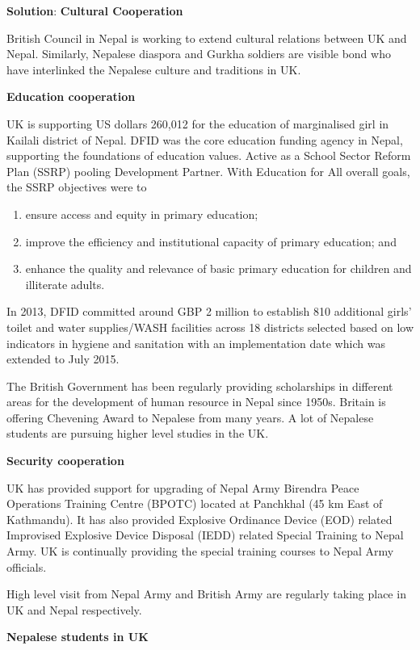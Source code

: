 \documentclass[
]{book}
\newenvironment{solution}{ {\bfseries Solution}:}{}
\begin{document}
\begin{solution}
\textbf{Cultural Cooperation}

British Council in Nepal is working to extend cultural relations between UK and Nepal. Similarly, Nepalese diaspora and Gurkha soldiers are visible bond who have interlinked the Nepalese culture and traditions in UK.

\textbf{Education cooperation}

UK is supporting US dollars 260,012 for the education of marginalised girl in Kailali district of Nepal. DFID was the core education funding agency in Nepal, supporting the foundations of education values. Active as a School Sector Reform Plan (SSRP) pooling Development Partner. With Education for All overall goals, the SSRP objectives were to 
\begin{enumerate}
\item ensure access and equity in primary education; 
\item improve the efficiency and institutional capacity of primary education; and 
\item enhance the quality and relevance of basic primary education for children and illiterate adults.
\end{enumerate}

In 2013, DFID committed around GBP 2 million to establish 810 additional girls' toilet and water supplies/WASH facilities across 18 districts selected based on low indicators in hygiene and sanitation with an implementation date which was extended to July 2015.

The British Government has been regularly providing scholarships in different areas for the development of human resource in Nepal since 1950s. Britain is offering Chevening Award to Nepalese from many years. A lot of Nepalese students are pursuing higher level studies in the UK. 

\textbf{Security cooperation}

UK has provided support for upgrading of Nepal Army Birendra Peace Operations Training Centre (BPOTC) located at Panchkhal (45 km East of Kathmandu). It has also provided Explosive Ordinance Device (EOD) related Improvised Explosive Device Disposal (IEDD) related Special Training to Nepal Army. UK is continually providing the special training courses to Nepal Army officials.

High level visit from Nepal Army and British Army are regularly taking place in UK and Nepal respectively.

\textbf{Nepalese students in UK}

\end{solution}
\end{document}
